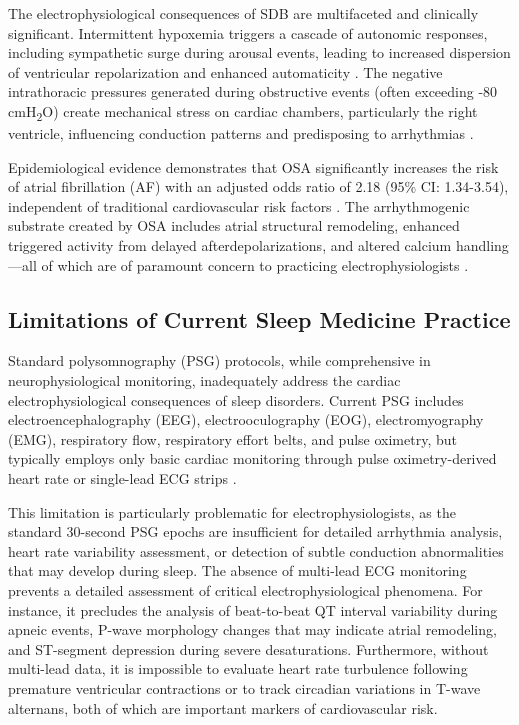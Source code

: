 \documentclass[11pt,en]{elegantpaper}
\begin{document}
The electrophysiological consequences of SDB are multifaceted and clinically significant. Intermittent hypoxemia triggers a cascade of autonomic responses, including sympathetic surge during arousal events, leading to increased dispersion of ventricular repolarization and enhanced automaticity \cite{somers2008}. The negative intrathoracic pressures generated during obstructive events (often exceeding -80 cmH\textsubscript{2}O) create mechanical stress on cardiac chambers, particularly the right ventricle, influencing conduction patterns and predisposing to arrhythmias \cite{guilleminault1983}.

Epidemiological evidence demonstrates that OSA significantly increases the risk of atrial fibrillation (AF) with an adjusted odds ratio of 2.18 (95\% CI: 1.34-3.54), independent of traditional cardiovascular risk factors \cite{mehra2006}. The arrhythmogenic substrate created by OSA includes atrial structural remodeling, enhanced triggered activity from delayed afterdepolarizations, and altered calcium handling—all of which are of paramount concern to practicing electrophysiologists \cite{linz2018}.

\subsection{Limitations of Current Sleep Medicine Practice}

Standard polysomnography (PSG) protocols, while comprehensive in neurophysiological monitoring, inadequately address the cardiac electrophysiological consequences of sleep disorders. Current PSG includes electroencephalography (EEG), electrooculography (EOG), electromyography (EMG), respiratory flow, respiratory effort belts, and pulse oximetry, but typically employs only basic cardiac monitoring through pulse oximetry-derived heart rate or single-lead ECG strips \cite{berry2012}.

This limitation is particularly problematic for electrophysiologists, as the standard 30-second PSG epochs are insufficient for detailed arrhythmia analysis, heart rate variability assessment, or detection of subtle conduction abnormalities that may develop during sleep. The absence of multi-lead ECG monitoring prevents a detailed assessment of critical electrophysiological phenomena. For instance, it precludes the analysis of beat-to-beat QT interval variability during apneic events, P-wave morphology changes that may indicate atrial remodeling, and ST-segment depression during severe desaturations. Furthermore, without multi-lead data, it is impossible to evaluate heart rate turbulence following premature ventricular contractions or to track circadian variations in T-wave alternans, both of which are important markers of cardiovascular risk.
\end{document}
